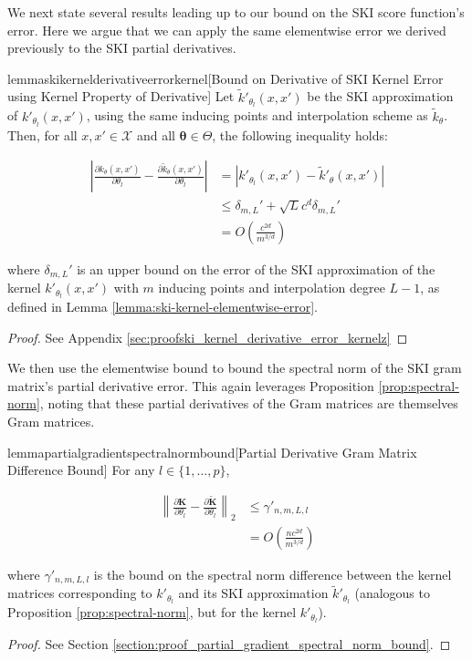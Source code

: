 We next state several results leading up to our bound on the SKI score function's error. Here we argue that we can apply the same elementwise error we derived previously to the SKI partial derivatives.

\begin{restatable}{lemma}{skikernelderivativeerrorkernel}[Bound on Derivative of SKI Kernel Error using Kernel Property of Derivative]
\label{lemma:ski_kernel_derivative_error_kernel}
 Let $\tilde{k}'_{\theta_l}(x,x')$ be the SKI approximation of $k'_{\theta_l}(x,x')$, using the same inducing points and interpolation scheme as $\tilde{k}_{\theta}$. Then, for all $x, x' \in \mathcal{X}$ and all $\boldsymbol{\theta} \in \Theta$, the following inequality holds:

\begin{align*}
\left\vert \frac{\partial k_{\theta}(x,x')}{\partial \theta_l}-\frac{\partial \tilde{k}_{\theta}(x,x')}{\partial \theta_l}\right\vert &= \left\vert k'_{\theta_l}(x, x') - \tilde{k}'_{\theta}(x, x') \right\vert \\
&\leq\delta_{m,L}'+\sqrt{L}c^d\delta_{m,L}'\\
&=O\left(\frac{c^{2d}}{m^{3/d}}\right)
\end{align*}

where $\delta_{m,L}'$ is an upper bound on the error of the SKI approximation of the kernel $k'_{\theta_l}(x,x')$ with $m$ inducing points and interpolation degree $L-1$, as defined in Lemma \ref{lemma:ski-kernel-elementwise-error}.
\end{restatable}
\begin{proof}
    See Appendix \ref{sec:proofski_kernel_derivative_error_kernelz}
\end{proof}

We then use the elementwise bound to bound the spectral norm of the SKI gram matrix's partial derivative error. This again leverages Proposition \ref{prop:spectral-norm}, noting that these partial derivatives of the Gram matrices are themselves Gram matrices.

\begin{restatable}{lemma}{partialgradientspectralnormbound}[Partial Derivative Gram Matrix Difference Bound]
\label{lemma:partial_gradient_spectral_norm_bound}
For any $l \in \{1, \dots, p\}$,

\begin{align*}
\left\| \frac{\partial \mathbf{K}}{\partial \theta_l} - \frac{\partial \tilde{\mathbf{K}}}{\partial \theta_l} \right\|_2 &\leq \gamma'_{n,m,L,l} \\
&= O\left(\frac{nc^{2d}}{m^{3/d}}\right)
\end{align*}

where $\gamma'_{n,m,L,l}$ is the bound on the spectral norm difference between the kernel matrices corresponding to $k'_{\theta_l}$ and its SKI approximation $\tilde{k}'_{\theta_l}$ (analogous to Proposition \ref{prop:spectral-norm}, but for the kernel $k'_{\theta_l}$).
\end{restatable}
\begin{proof}
See Section \ref{section:proof_partial_gradient_spectral_norm_bound}.    
\end{proof}

